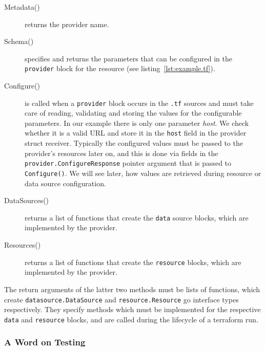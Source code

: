 \documentclass[paper=a4,11pt,numbers=noenddot]{article}
\begin{document}
\begin{description}
\item[Metadata()] returns the provider name.
\item[Schema()] specifies and returns the parameters that can be configured in the \verb'provider' block for the resource (see listing~\ref{lst:example.tf}).
\item[Configure()] is called when a \verb'provider' block occurs in the \verb'.tf' sources and must take care of reading, validating and storing the values for the configurable parameters. In our example there is only one parameter \emph{host}. We check whether it is a valid URL and store it in the \verb'host' field in the provider struct receiver. Typically the configured values must be passed to the provider's resources later on, and this is done via fields in the \verb'provider.ConfigureResponse' pointer argument that is passed to \verb'Configure()'. We will see later, how values are retrieved during resource or data source configuration.
\item[DataSources()] returns a list of functions that create the \verb'data' source blocks, which are implemented by the provider.
  \item[Resources()] returns a list of functions that create the \verb'resource' blocks, which are implemented by the provider.
\end{description}

The return arguments of the latter two methods must be lists of functions, which create \verb'datasource.DataSource' and \verb'resource.Resource' go interface types respectively. They specify methods which must be implemented for the respective \verb'data' and \verb'resource' blocks, and are called during the lifecycle of a terraform run.

\subsubsection{A Word on Testing}
\label{subsubsec:note-on-testing}
\end{document}
